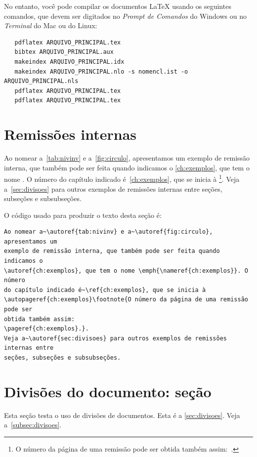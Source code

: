 No entanto, você pode compilar os documentos \LaTeX{} usando os seguintes
comandos, que devem ser digitados no \emph{Prompt de Comandos} do Windows ou no
\emph{Terminal} do Mac ou do Linux:

\begin{verbatim}
   pdflatex ARQUIVO_PRINCIPAL.tex
   bibtex ARQUIVO_PRINCIPAL.aux
   makeindex ARQUIVO_PRINCIPAL.idx
   makeindex ARQUIVO_PRINCIPAL.nlo -s nomencl.ist -o ARQUIVO_PRINCIPAL.nls
   pdflatex ARQUIVO_PRINCIPAL.tex
   pdflatex ARQUIVO_PRINCIPAL.tex
\end{verbatim}

\section{Remissões internas}

Ao nomear a~\autoref{tab:nivinv} e a~\autoref{fig:circulo}, apresentamos um
exemplo de remissão interna, que também pode ser feita quando indicamos o
\autoref{ch:exemplos}, que tem o nome \emph{}. O número
do capítulo indicado é~\ref{ch:exemplos}, que se inicia à
\footnote{O número da página de uma remissão pode ser
  obtida também assim:~\pageref{ch:exemplos}.}.
Veja a~\autoref{sec:divisoes} para outros exemplos de remissões internas entre
seções, subseções e subsubseções.

O código usado para produzir o texto desta seção é:

\begin{verbatim}
Ao nomear a~\autoref{tab:nivinv} e a~\autoref{fig:circulo}, apresentamos um
exemplo de remissão interna, que também pode ser feita quando indicamos o
\autoref{ch:exemplos}, que tem o nome \emph{\nameref{ch:exemplos}}. O número
do capítulo indicado é~\ref{ch:exemplos}, que se inicia à
\autopageref{ch:exemplos}\footnote{O número da página de uma remissão pode ser
obtida também assim:
\pageref{ch:exemplos}.}.
Veja a~\autoref{sec:divisoes} para outros exemplos de remissões internas entre
seções, subseções e subsubseções.
\end{verbatim}

\section{Divisões do documento: seção}%
\label{sec:divisoes}

Esta seção testa o uso de divisões de documentos. Esta é a
\autoref{sec:divisoes}. Veja a~\autoref{subsec:divisoes}.

